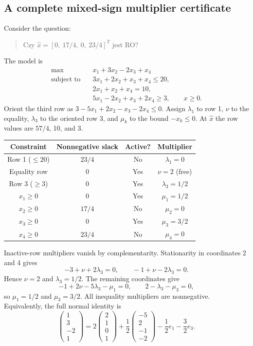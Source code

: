 \documentclass[11pt,a4paper]{article}
\begin{document}
\subsection{A complete mixed-sign multiplier certificate}\label{sec:kkt-example}
Consider the question:
\begin{quote}
  Czy $\hat x=[0,\ 17/4,\ 0,\ 23/4]^T$ jest RO?
\end{quote}
The model is
\begin{equation}\label{eq:kkt-model}
  \begin{aligned}
    \max\quad&x_1+3x_2-2x_3+x_4\\
    \text{subject to}\quad&3x_1+2x_2+x_3+x_4\leq20,\\
    &2x_1+x_2+x_4=10,\\
    &5x_1-2x_2+x_3+2x_4\geq3,\qquad x\geq0.
  \end{aligned}
\end{equation}
Orient the third row as $3-5x_1+2x_2-x_3-2x_4\leq0$.
Assign $\lambda_1$ to row 1, $\nu$ to the equality, $\lambda_3$ to the
oriented row 3, and $\mu_k$ to the bound $-x_k\leq0$.
At $\hat x$ the row values are $57/4$, 10, and 3.
\begin{center}
  \begin{tabular}{c|c|c|c}\toprule
    Constraint & Nonnegative slack & Active? & Multiplier\\\midrule
    Row 1 ($\leq20$) & $23/4$ & No & $\lambda_1=0$\\
    Equality row & 0 & Yes & $\nu=2$ (free)\\
    Row 3 ($\geq3$) & 0 & Yes & $\lambda_3=1/2$\\
    $x_1\geq0$ & 0 & Yes & $\mu_1=1/2$\\
    $x_2\geq0$ & $17/4$ & No & $\mu_2=0$\\
    $x_3\geq0$ & 0 & Yes & $\mu_3=3/2$\\
    $x_4\geq0$ & $23/4$ & No & $\mu_4=0$\\\bottomrule
  \end{tabular}
\end{center}
Inactive-row multipliers vanish by complementarity.
Stationarity in coordinates 2 and 4 gives
\[
  -3+\nu+2\lambda_3=0,\qquad -1+\nu-2\lambda_3=0.
\]
Hence $\nu=2$ and $\lambda_3=1/2$. The remaining coordinates give
\[
  -1+2\nu-5\lambda_3-\mu_1=0,\qquad
  2-\lambda_3-\mu_3=0,
\]
so $\mu_1=1/2$ and $\mu_3=3/2$. All inequality multipliers are nonnegative.
Equivalently, the full normal identity is
\[
  \begin{pmatrix}1\\3\\-2\\1\end{pmatrix}
  =2\begin{pmatrix}2\\1\\0\\1\end{pmatrix}
  +\frac12\begin{pmatrix}-5\\2\\-1\\-2\end{pmatrix}
  -\frac12 e_1-\frac32 e_3.
\]
\end{document}
